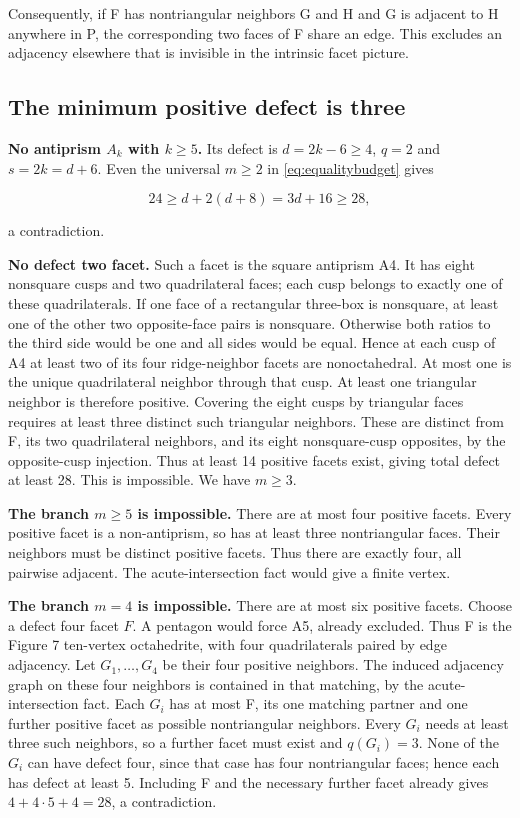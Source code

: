 \documentclass[11pt]{article}
\theoremstyle{remark}
\begin{document}
Consequently, if F has nontriangular neighbors G and H and G is adjacent to H anywhere in P, the corresponding two faces of F share an edge. This excludes an adjacency elsewhere that is invisible in the intrinsic facet picture.

\subsection{The minimum positive defect is three}\label{first-reduction-the-minimum-positive-defect-is-three}

\textbf{No antiprism \(A_k\) with \(k\ge5\).} Its defect is \(d=2k-6\ge4\), \(q=2\) and \(s=2k=d+6\). Even the universal \(m\ge2\) in \eqref{eq:equalitybudget} gives

\[
 24\ge d+2(d+8)=3d+16\ge28,
\]

a contradiction.

\textbf{No defect two facet.} Such a facet is the square antiprism A4. It has eight nonsquare cusps and two quadrilateral faces; each cusp belongs to exactly one of these quadrilaterals. If one face of a rectangular three-box is nonsquare, at least one of the other two opposite-face pairs is nonsquare. Otherwise both ratios to the third side would be one and all sides would be equal. Hence at each cusp of A4 at least two of its four ridge-neighbor facets are nonoctahedral. At most one is the unique quadrilateral neighbor through that cusp. At least one triangular neighbor is therefore positive. Covering the eight cusps by triangular faces requires at least three distinct such triangular neighbors. These are distinct from F, its two quadrilateral neighbors, and its eight nonsquare-cusp opposites, by the opposite-cusp injection. Thus at least 14 positive facets exist, giving total defect at least 28. This is impossible. We have \(m\ge3\).

\textbf{The branch \(m\ge5\) is impossible.} There are at most four positive facets. Every positive facet is a non-antiprism, so has at least three nontriangular faces. Their neighbors must be distinct positive facets. Thus there are exactly four, all pairwise adjacent. The acute-intersection fact would give a finite vertex.

\textbf{The branch \(m=4\) is impossible.} There are at most six positive facets. Choose a defect four facet \(F\). A pentagon would force A5, already excluded. Thus F is the Figure 7 ten-vertex octahedrite, with four quadrilaterals paired by edge adjacency. Let \(G_1,\dots,G_4\) be their four positive neighbors. The induced adjacency graph on these four neighbors is contained in that matching, by the acute-intersection fact. Each \(G_i\) has at most F, its one matching partner and one further positive facet as possible nontriangular neighbors. Every \(G_i\) needs at least three such neighbors, so a further facet must exist and \(q(G_i)=3\). None of the \(G_i\) can have defect four, since that case has four nontriangular faces; hence each has defect at least 5. Including F and the necessary further facet already gives \(4+4\cdot5+4=28\), a contradiction.
\end{document}
